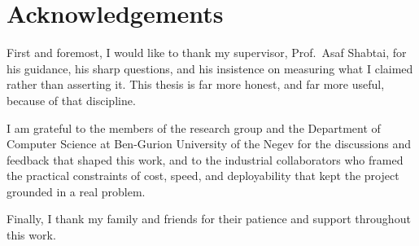 \chapter*{Acknowledgements}

First and foremost, I would like to thank my supervisor, Prof.\ Asaf Shabtai,
for his guidance, his sharp questions, and his insistence on measuring what I
claimed rather than asserting it. This thesis is far more honest, and far more
useful, because of that discipline.

I am grateful to the members of the research group and the Department of
Computer Science at Ben-Gurion University of the Negev for the discussions and
feedback that shaped this work, and to the industrial collaborators who framed
the practical constraints of cost, speed, and deployability that kept the
project grounded in a real problem.

Finally, I thank my family and friends for their patience and support
throughout this work.
